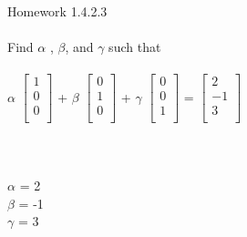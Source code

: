 \documentclass[11pt]{article}
\begin{document}
\\
\\
\\
Homework 1.4.2.3
\\
\\
Find $\alpha$ , $\beta$, and $\gamma$ such that
\\
\\
$
\alpha
$
$
\begin{bmatrix}
{1}\\
{0}\\
{0}\\
\end{bmatrix}
$
+
$
\beta
$
$
\begin{bmatrix}
{0}\\
{1}\\
{0}\\
\end{bmatrix}
$
+
$
\gamma
$
$
\begin{bmatrix}
{0}\\
{0}\\
{1}\\
\end{bmatrix}
$
=
$
\begin{bmatrix}
{2}\\
{-1}\\
{3}\\
\end{bmatrix}
$
\\
\\
\\
\\
$\alpha$ = 2
\\
$\beta$ = -1
\\
$\gamma$ = 3
\\
\\
\end{document}
